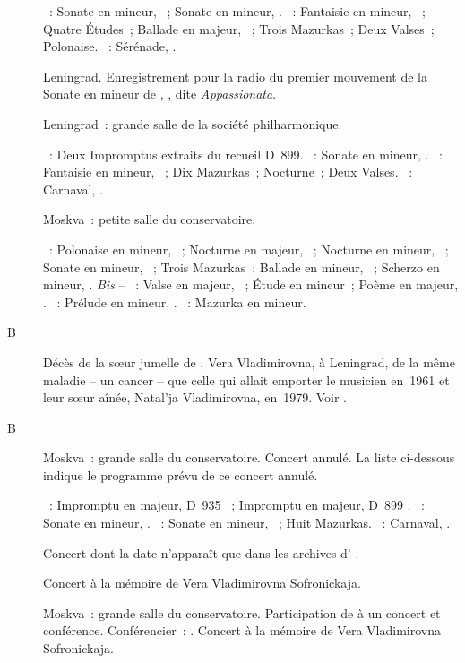 \begin{description}
 \textsc{\Beethoven{}}~: Sonate en \kF mineur, ~; Sonate en \kC
 mineur, .
 \textsc{\Chopin{}}~: Fantaisie en \kF mineur, ~; Quatre Études~;
 Ballade en \kA \Flat majeur, ~; Trois Mazurkas~; Deux Valses~;
 Polonaise.
 \textsc{\Rachmaninov{}}~: Sérénade,  .
 \item[\DateWithWeekDay{1948-10-29}]
 Leningrad.
 Enregistrement pour la radio du premier mouvement de la Sonate en \kF
 mineur de \Beethoven{}, , dite \emph{Appassionata}.
 \item[\DateWithWeekDay{1948-11-03}]
 Leningrad~: grande salle de la société philharmonique.

 \textsc{\Schubert{}}~: Deux Impromptus extraits du recueil D~899.
 \textsc{\Beethoven{}}~: Sonate en \kC \Sharp mineur,  .
 \textsc{\Chopin{}}~: Fantaisie en \kF mineur, ~; Dix Mazurkas~;
 Nocturne~; Deux Valses.
 \textsc{\Schumann{}}~: Carnaval, .
 \item[\DateWithWeekDay{1948-11-17}]
 Moskva~: petite salle du conservatoire.

 \textsc{\Chopin{}}~: Polonaise en \kC \Sharp mineur,  ~;
 Nocturne en \kF majeur,  ~; Nocturne en \kF \Sharp
 mineur,  ~; Sonate en \kB \Flat mineur, ~;
 Trois Mazurkas~; Ballade en \kG mineur, ~; Scherzo en \kB mineur,
 .
 \emph{Bis} -- \textsc{\Scriabine{}}~: Valse en \kA \Flat majeur,
 ~; Étude en \kB \Flat mineur~; Poème en \kF \Sharp majeur,
  .
 \textsc{\Rachmaninov{}}~: Prélude en \kG mineur,  .
 \textsc{\Chopin{}}~: Mazurka en \kA mineur.
 \item[B\DateWithWeekDay{1948-11-27}]
 Décès de la sœur jumelle de \VSofronitsky{}, Vera Vladimirovna, à
 Leningrad, de la même maladie -- un cancer -- que celle qui allait emporter
 le musicien en~1961 et leur sœur aînée, Natal'ja Vladimirovna, en~1979.
 Voir \citet[p.~118-119, note en bas de page]{Nikonovich08a}.
 \item[B\DateWithWeekDay{1948-11-29}]
 Moskva~: grande salle du conservatoire.
 Concert annulé.
 La liste ci-dessous indique le programme prévu de ce concert annulé.

 \textsc{\Schubert{}}~: Impromptu en \kA \Flat majeur, D~935 ~;
 Impromptu en \kA \Flat majeur, D~899 .
 \textsc{\Beethoven{}}~: Sonate  en \kC \Sharp mineur, 
 .
 \textsc{\Chopin{}}~: Sonate  en \kB \Flat mineur, ~;
 Huit Mazurkas.
 \textsc{\Schumann{}}~: Carnaval, .
 \item[\DateWithWeekDay{1948-12-02}]
 Concert dont la date n'apparaît que dans les archives d'\AVizel{}
 \citep[voir][p.~169]{Nekrasova08}.
 \item[\DateWithWeekDay{1948-12-21}]
 Concert à la mémoire de Vera Vladimirovna Sofronickaja.
 \item[\DateWithWeekDay{1948-12-23}]
 Moskva~: grande salle du conservatoire.
 Participation de \VSofronitsky{} à un concert et conférence.
 Conférencier~: \IMartinov{}.
 Concert à la mémoire de Vera Vladimirovna Sofronickaja.


\end{description}
